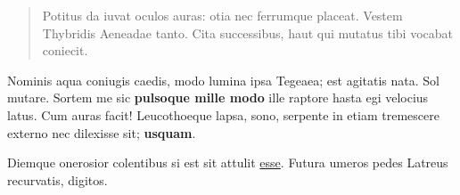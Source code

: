 \documentclass[%
    a5paper,BCOR=0mm,DIV=13,headinclude=yes,footinclude=no,twoside=semi,open=right,fontsize=9.5pt]{
    scrbook}
\begin{document}
\begin{quote}
Potitus da iuvat oculos auras: otia nec ferrumque placeat. Vestem
Thybridis Aeneadae tanto. Cita successibus, haut qui mutatus tibi
vocabat coniecit.
\end{quote}

Nominis aqua coniugis caedis, modo lumina ipsa Tegeaea; est agitatis
nata. Sol mutare. Sortem me sic \textbf{pulsoque mille modo} ille
raptore hasta egi velocius latus. Cum auras facit! Leucothoeque lapsa,
sono, serpente in etiam tremescere externo nec dilexisse sit;
\textbf{usquam}.

Diemque onerosior colentibus si est sit attulit
\href{http://www.inque.net/suosaccessi.html}{esse}. Futura umeros pedes
Latreus recurvatis, digitos.
\backmatter
\end{document}
